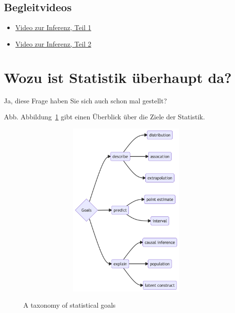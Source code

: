 \documentclass[
  a4paper,
  DIV=11]{scrreprt}
\providecommand{\tightlist}{%
  \setlength{\itemsep}{0pt}\setlength{\parskip}{0pt}}\usepackage{longtable,booktabs,array}
\theoremstyle{definition}
\theoremstyle{remark}
\begin{document}
\hypertarget{begleitvideos}{%
\subsection{Begleitvideos}\label{begleitvideos}}

\begin{itemize}
\tightlist
\item
  \href{https://youtu.be/gcwWwBy0kPI}{Video zur Inferenz, Teil 1}
\item
  \href{https://https://youtu.be/QNMVi6IqQ90}{Video zur Inferenz, Teil
  2}
\end{itemize}

\hypertarget{wozu-ist-statistik-uxfcberhaupt-da}{%
\section{Wozu ist Statistik überhaupt
da?}\label{wozu-ist-statistik-uxfcberhaupt-da}}

Ja, diese Frage haben Sie sich auch schon mal gestellt?

Abb. Abbildung~\ref{fig-goals} gibt einen Überblick über die Ziele der
Statistik.

\begin{figure}

{\centering 

\begin{figure}[H]

{\centering \includegraphics[width=5.5in,height=3.5in]{./Inferenz_files/figure-latex/mermaid-figure-1.png}

}

\end{figure}

}

\caption{\label{fig-goals}A taxonomy of statistical goals}

\end{figure}
\end{document}
